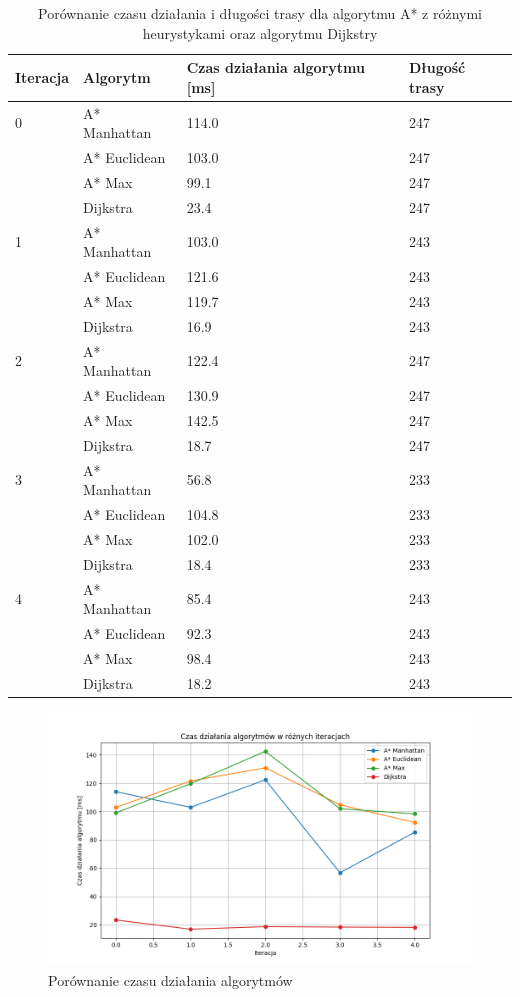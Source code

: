\documentclass[12pt,twoside]{article}
\begin{document}
\begin{table}[h]
\centering
\begin{tabular}{|p{}|p{}|p{}|p{}|}    
\hline
\textbf{Iteracja} & \textbf{Algorytm} & \textbf{Czas działania algorytmu [ms]} & \textbf{Długość trasy} \\
\hline
0 & 
A* Manhattan & 
114.0 & 
247 \\
 & 
A* Euclidean & 
103.0 & 
247 \\
 & 
A* Max & 
99.1 & 
247 \\
 & 
Dijkstra & 
23.4 & 
247 \\
\hline
1 & 
A* Manhattan & 
103.0 & 
243 \\
 & 
A* Euclidean & 
121.6 & 
243 \\
 & 
A* Max & 
119.7 & 
243 \\
 & 
Dijkstra & 
16.9 & 
243 \\
\hline
2 & 
A* Manhattan & 
122.4 & 
247 \\
 & 
A* Euclidean & 
130.9 & 
247 \\
 & 
A* Max & 
142.5 & 
247 \\
 & 
Dijkstra & 
18.7 & 
247 \\
\hline
3 & 
A* Manhattan & 
56.8 & 
233 \\
 & 
A* Euclidean & 
104.8 & 
233 \\
 & 
A* Max & 
102.0 & 
233 \\
 & 
Dijkstra & 
18.4 & 
233 \\
\hline
4 & 
A* Manhattan & 
85.4 & 
243 \\
 & 
A* Euclidean & 
92.3 & 
243 \\
 & 
A* Max & 
98.4 & 
243 \\
 & 
Dijkstra & 
18.2 & 
243 \\
\hline
\end{tabular}
\caption{Porównanie czasu działania i długości trasy dla algorytmu A* z różnymi heurystykami oraz algorytmu Dijkstry}
\label{Tab:Astar_Dijkstra_results}
\end{table}


\begin{figure}[ht]%
 \centering%
 \includegraphics[width=12cm]{figures/static_algo/charts/walls/algorithm_times_walls.png}%
 \caption{Porównanie czasu działania algorytmów}%
 \label{Fig:astar_vs_dijkstra_walls}%
\end{figure}
\end{document}
